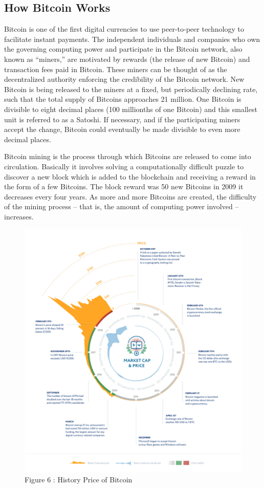 \documentclass[11pt]{article}
\makeatletter
\def\maxwidth{\ifdim\Gin@nat@width>\linewidth\linewidth
    \else\Gin@nat@width\fi}
\let\Oldincludegraphics\includegraphics
\renewcommand{\includegraphics}[1]{\Oldincludegraphics[width=.8\maxwidth]{#1}}
\makeatother
\begin{document}
    \hypertarget{how-bitcoin-works}{%
\subsection{How Bitcoin Works}\label{how-bitcoin-works}}

    Bitcoin is one of the first digital currencies to use peer-to-peer
technology to facilitate instant payments. The independent individuals
and companies who own the governing computing power and participate in
the Bitcoin network, also known as ``miners,'' are motivated by rewards
(the release of new Bitcoin) and transaction fees paid in Bitcoin. These
miners can be thought of as the decentralized authority enforcing the
credibility of the Bitcoin network. New Bitcoin is being released to the
miners at a fixed, but periodically declining rate, such that the total
supply of Bitcoins approaches 21 million. One Bitcoin is divisible to
eight decimal places (100 millionths of one Bitcoin) and this smallest
unit is referred to as a Satoshi. If necessary, and if the participating
miners accept the change, Bitcoin could eventually be made divisible to
even more decimal places.

    Bitcoin mining is the process through which Bitcoins are released to
come into circulation. Basically it involves solving a computationally
difficult puzzle to discover a new block which is added to the
blockchain and receiving a reward in the form of a few Bitcoins. The
block reward was 50 new Bitcoins in 2009 it decreases every four years.
As more and more Bitcoins are created, the difficulty of the mining
process -- that is, the amount of computing power involved -- increases.


\begin{figure}[H]
	\centering
		\includegraphics{history_price.jpg}
		  \caption{Figure 6 : History Price of Bitcoin}
\end{figure}
\end{document}
